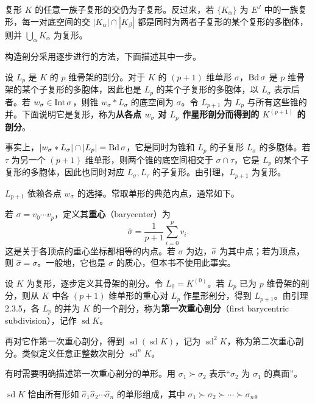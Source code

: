 复形 $K$ 的任意一族子复形的交仍为子复形。反过来，若 $\{K_\alpha\}$ 为 $E^J$ 中的一族复形，每一对底空间的交 $|K_\alpha|\cap|K_\beta|$ 都是同时为两者子复形的某个复形的多胞体，则并 $\bigcup_\alpha K_\alpha$ 为复形。

构造剖分采用逐步进行的方法，下面描述其中一步。

设 $L_p$ 是 $K$ 的 $p$ 维骨架的剖分。对于 $K$ 的 $(p+1)$ 维单形 $\sigma$，$\operatorname{Bd}\sigma$ 是 $p$ 维骨架的某个子复形的多胞体，因此也是 $L_p$ 的某个子复形的多胞体，以 $L_\sigma$ 表示后者。若 $w_\sigma\in\operatorname{Int}\sigma$，则锥 $w_\sigma*L_\sigma$ 的底空间为 $\sigma$。令 $L_{p+1}$ 为 $L_p$ 与所有这些锥的并。下面说明它是复形，称为\textbf{从各点 $w_\sigma$ 对 $L_p$ 作星形剖分而得到的 $K^{(p+1)}$ 的剖分}。

事实上，$|w_\sigma*L_\sigma|\cap|L_p|=\operatorname{Bd}\sigma$，它是同时为锥和 $L_p$ 的子复形 $L_\sigma$ 的多胞体。若 $\tau$ 为另一个 $(p+1)$ 维单形，则两个锥的底空间相交于 $\sigma\cap\tau$，它是 $L_p$ 的某个子复形的多胞体，因此也同时对应 $L_\sigma,L_\tau$ 的子复形。由引理，$L_{p+1}$ 为复形。

$L_{p+1}$ 依赖各点 $w_\sigma$ 的选择。常取单形的典范内点，通常如下。

若 $\sigma=v_0\cdots v_p$，定义其\textbf{重心}（barycenter）为
\[
\widehat\sigma=\frac1{p+1}\sum_{i=0}^p v_i.
\]
这是关于各顶点的重心坐标都相等的内点。若 $\sigma$ 为边，$\widehat\sigma$ 为其中点；若为顶点，则 $\widehat\sigma=\sigma$。一般地，它也是 $\sigma$ 的质心，但本书不使用此事实。

设 $K$ 为复形，逐步定义其骨架的剖分。令 $L_0=K^{(0)}$。若 $L_p$ 已为 $p$ 维骨架的剖分，则从 $K$ 中各 $(p+1)$ 维单形的重心对 $L_p$ 作星形剖分，得到 $L_{p+1}$。由引理 2.3.5，各 $L_p$ 的并为 $K$ 的一个剖分，称为\textbf{第一次重心剖分}（first barycentric subdivision），记作 $\operatorname{sd}K$。

再对它作第一次重心剖分，得到 $\operatorname{sd}(\operatorname{sd}K)$，记为 $\operatorname{sd}^2K$，称为第二次重心剖分。类似定义任意正整数次剖分 $\operatorname{sd}^nK$。

有时需要明确描述第一次重心剖分的单形。用 $\sigma_1\succ\sigma_2$ 表示“$\sigma_2$ 为 $\sigma_1$ 的真面”。

$\operatorname{sd}K$ 恰由所有形如 $\widehat\sigma_1\widehat\sigma_2\cdots\widehat\sigma_n$ 的单形组成，其中 $\sigma_1\succ\sigma_2\succ\cdots\succ\sigma_n$。

